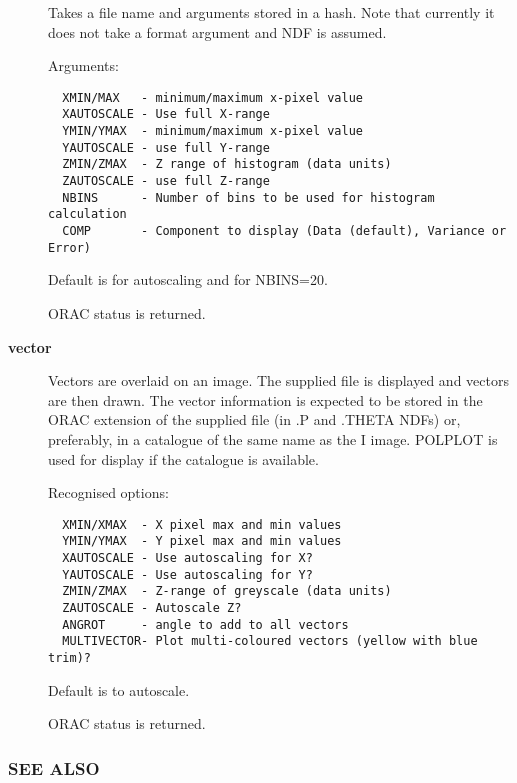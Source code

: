 \begin{description}
Takes a file name and arguments stored in a hash.
Note that currently it does not take a format argument
and NDF is assumed.



Arguments:

\begin{verbatim}
  XMIN/MAX   - minimum/maximum x-pixel value
  XAUTOSCALE - Use full X-range
  YMIN/YMAX  - minimum/maximum x-pixel value
  YAUTOSCALE - use full Y-range
  ZMIN/ZMAX  - Z range of histogram (data units)
  ZAUTOSCALE - use full Z-range
  NBINS      - Number of bins to be used for histogram calculation
  COMP       - Component to display (Data (default), Variance or Error)
\end{verbatim}


Default is for autoscaling and for NBINS=20.



ORAC status is returned.


\item[\textbf{vector}] \mbox{}

Vectors are overlaid on an image. The supplied file is displayed
and vectors are then drawn. The vector information is expected
to be stored in the ORAC extension of the supplied file
(in .P and .THETA NDFs) or, preferably, in a catalogue of the
same name as the I image. POLPLOT is used for display if
the catalogue is available.



Recognised options:

\begin{verbatim}
  XMIN/XMAX  - X pixel max and min values
  YMIN/YMAX  - Y pixel max and min values
  XAUTOSCALE - Use autoscaling for X?
  YAUTOSCALE - Use autoscaling for Y?
  ZMIN/ZMAX  - Z-range of greyscale (data units)
  ZAUTOSCALE - Autoscale Z?
  ANGROT     - angle to add to all vectors
  MULTIVECTOR- Plot multi-coloured vectors (yellow with blue trim)?
\end{verbatim}


Default is to autoscale.



ORAC status is returned.

\end{description}
\subsubsection*{SEE ALSO\label{ORAC::Display::KAPVIEW_SEE_ALSO}}


